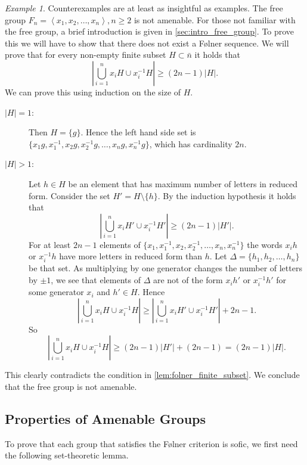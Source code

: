 \documentclass[titlepage, a4paper]{article}
\newcommand{\card}[1]{\left| #1 \right|}
\theoremstyle{remark}
\newtheorem{example}[theorem]{Example}
\begin{document}
\begin{example}
	Counterexamples are at least as insightful as examples. 
	The free group $F_n = \left<x_1, x_2, \ldots, x_n \right>, n \ge 2$ is not amenable. %
	For those not familiar with the free group, a brief introduction is given in \cref{sec:intro_free_group}.
	To prove this we will have to show that there does not exist a Følner sequence.
	We will prove that for every non-empty finite subset $H \subset \bar{n}$ it holds that \[
		\card{\bigcup_{i = 1}^{n} x_iH \cup x_i^{-1}H} \ge (2n-1) \card{H}
	.\] 
	We can prove this using induction on the size of $H$. 
	\begin{description}
		\item[$\card{H} = 1$:] Then $H = \{g\}$. 
			Hence the left hand side set is $\{x_1g, x_1^{-1}, x_2g, x_2^{-1}g, \ldots, x_ng, x_n^{-1}g\} $, which has cardinality $2n$. 
		\item[$\card{H} > 1$:] 
			Let $ h \in H$ be an element that has maximum number of letters in reduced form.
			Consider the set $H' = H\setminus \{h\} $. 
			By the induction hypothesis it holds that 
			\[	
				\card{\bigcup_{i = 1}^{n} x_iH' \cup x_i^{-1}H'} \ge (2n-1) \card{H'}
			.\] 
			For at least $2n-1$ elements of $\{x_1,x_1^{-1},x_2,x_2^{-1},\ldots, x_n, x_n^{-1}\} $ the words $x_ih$ or  $x_i^{-1}h$ have more letters in reduced form than $h$. Let $\Delta = \{ h_1, h_2, \ldots, h_n\} $ be that set.  
			As multiplying by one generator changes the number of letters by $\pm 1$, we see that elements of $\Delta$ are not of the form $x_ih'$ or $x_i^{-1}h'$ for some generator $x_i$ and $h' \in H$. 
			Hence \[
				\card{\bigcup_{i = 1}^{n} x_iH \cup x_i^{-1}H}  \ge \card{\bigcup_{i = 1}^{n} x_iH' \cup x_i^{-1}H'} + 2n-1
 			.\]
			So \[
				\card{\bigcup_{i = 1}^{n} x_iH \cup x_i^{-1}H} \ge (2n-1)\card{H'} + (2n-1) = (2n-1 ) \card{H}
			.\]
	\end{description}
	This clearly contradicts the condition in \cref{lem:folner_finite_subset}. 
	We conclude that the free group is not amenable.
\end{example}

\subsection{Properties of Amenable Groups}

To prove that each group that satisfies the Følner criterion is sofic, we first need the following set-theoretic lemma.
\end{document}
